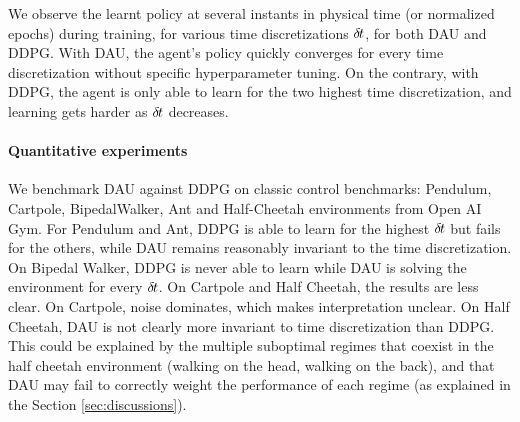 We observe the learnt policy at several instants in physical time (or normalized epochs) during training, for various time discretizations ${\delta\hspace{-.1em}t}$, for both DAU and DDPG. With DAU, the agent's policy quickly converges for every time discretization without specific hyperparameter tuning. On the contrary, with DDPG, the agent is only able to learn for the two highest time discretization, and learning gets harder as ${\delta\hspace{-.1em}t}$ decreases.

\paragraph{Quantitative experiments}
We benchmark DAU against DDPG on classic control benchmarks: Pendulum, Cartpole, BipedalWalker, Ant and Half-Cheetah environments from Open AI Gym. For Pendulum and Ant, DDPG is able to learn for the highest ${\delta\hspace{-.1em}t}$ but fails for the others, while DAU remains reasonably invariant to the time discretization. On Bipedal Walker, DDPG is never able to learn while DAU is solving the environment for every ${\delta\hspace{-.1em}t}$. On Cartpole and Half Cheetah, the results are less clear. On Cartpole, noise dominates, which makes interpretation unclear. On Half Cheetah, DAU is not clearly more invariant to time discretization than DDPG. This could be explained by the multiple suboptimal regimes that coexist in the half cheetah environment (walking on the head, walking on the back), and that DAU may fail to correctly weight the performance of each regime (as explained in the Section \ref{sec:discussions}).


% 
